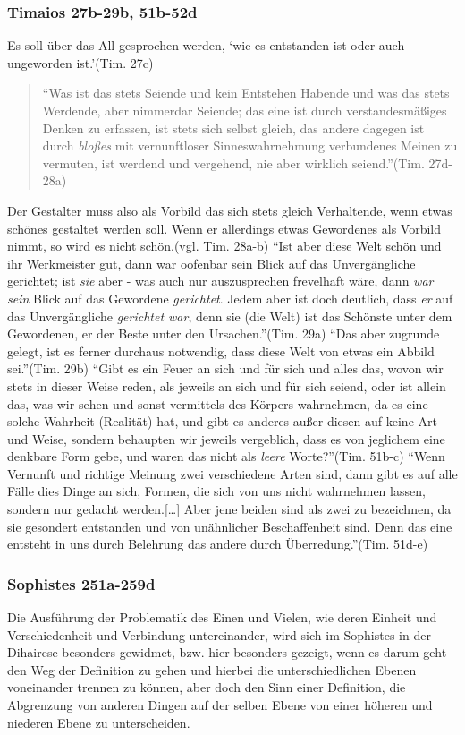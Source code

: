 \documentclass[12pt]{article}
\newcommand*{\zitatblock}[1]{%
    \begin{quote}
    \fontsize{10}{12}\selectfont
    \setlength{\parskip}{1.0em}
    #1
    \end{quote}
}
\begin{document}
\subsubsection{Timaios 27b-29b, 51b-52d}
Es soll über das All gesprochen werden, \enquote*{wie es entstanden ist oder auch ungeworden ist.}(Tim. 27c)\nocite{TimaiosSchleiermacher}
\zitatblock{\enquote{Was ist das stets Seiende und kein Entstehen Habende und was das stets Werdende, aber nimmerdar Seiende; das eine ist durch verstandesmäßiges Denken zu erfassen, ist stets sich selbst gleich, das andere dagegen ist durch \emph{bloßes} mit vernunftloser Sinneswahrnehmung verbundenes Meinen zu vermuten, ist werdend und vergehend, nie aber wirklich seiend.}(Tim. 27d-28a)}
Der Gestalter muss also als Vorbild das sich stets gleich Verhaltende, wenn etwas schönes gestaltet werden soll. Wenn er allerdings etwas Gewordenes als Vorbild nimmt, so wird es nicht schön.(vgl. Tim. 28a-b)
\enquote{Ist aber diese Welt schön und ihr Werkmeister gut, dann war oofenbar sein Blick auf das Unvergängliche gerichtet; ist \emph{sie} aber - was auch nur auszusprechen frevelhaft wäre, dann \emph{war sein} Blick auf das Gewordene \emph{gerichtet}. Jedem aber ist doch deutlich, dass \emph{er} auf das Unvergängliche \emph{gerichtet war}, denn sie (die Welt) ist das Schönste unter dem Gewordenen, er der Beste unter den Ursachen.}(Tim. 29a)
\enquote{Das aber zugrunde gelegt, ist es ferner durchaus notwendig, dass diese Welt von etwas ein Abbild sei.}(Tim. 29b)
\enquote{Gibt es ein Feuer an sich und für sich und alles das, wovon wir stets in dieser Weise reden, als jeweils an sich und für sich seiend, oder ist allein das, was wir sehen und sonst vermittels des Körpers wahrnehmen, da es eine solche Wahrheit (Realität) hat, und gibt es anderes außer diesen auf keine Art und Weise, sondern behaupten wir jeweils vergeblich, dass es von jeglichem eine denkbare Form gebe, und waren das nicht als \emph{leere} Worte?}(Tim. 51b-c)
\enquote{Wenn Vernunft und richtige Meinung zwei verschiedene Arten sind, dann gibt es auf alle Fälle dies Dinge an sich, Formen, die sich von uns nicht wahrnehmen lassen, sondern nur gedacht werden.[\dots] Aber jene beiden sind als zwei zu bezeichnen, da sie gesondert entstanden und von unähnlicher Beschaffenheit sind. Denn das eine entsteht in uns durch Belehrung das andere durch Überredung.}(Tim. 51d-e)
\subsubsection{Sophistes 251a-259d}
Die Ausführung der Problematik des Einen und Vielen, wie deren Einheit und Verschiedenheit und Verbindung untereinander, wird sich im Sophistes in der Dihairese besonders gewidmet, bzw. hier besonders gezeigt, wenn es darum geht den Weg der Definition zu gehen und hierbei die unterschiedlichen Ebenen voneinander trennen zu können, aber doch den Sinn einer Definition, die Abgrenzung von anderen Dingen auf der selben Ebene von einer höheren und niederen Ebene zu unterscheiden.
\end{document}
